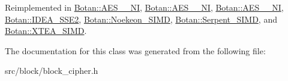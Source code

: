 Reimplemented in \hyperlink{classBotan_1_1AES__256__NI_ae1665eab51de52a0fa31d6dddad61bfb}{Botan\-::\-A\-E\-S\-\_\-\_\-\-N\-I}, \hyperlink{classBotan_1_1AES__192__NI_afa36a09a188d5c222d8eecdfc3cb406a}{Botan\-::\-A\-E\-S\-\_\-\_\-\-N\-I}, \hyperlink{classBotan_1_1AES__128__NI_adfc8b702ee1865e4363d29cea8867c48}{Botan\-::\-A\-E\-S\-\_\-\_\-\-N\-I}, \hyperlink{classBotan_1_1IDEA__SSE2_abdddb2c041e84106060c9f07f0091e80}{Botan\-::\-I\-D\-E\-A\-\_\-\-S\-S\-E2}, \hyperlink{classBotan_1_1Noekeon__SIMD_ad3c3f7932218b1b1f78b409accb6e4fe}{Botan\-::\-Noekeon\-\_\-\-S\-I\-M\-D}, \hyperlink{classBotan_1_1Serpent__SIMD_a61e8fa4a2a69719d049555a833d9ba81}{Botan\-::\-Serpent\-\_\-\-S\-I\-M\-D}, and \hyperlink{classBotan_1_1XTEA__SIMD_a844069bae910399d2d2632ae1f419a6b}{Botan\-::\-X\-T\-E\-A\-\_\-\-S\-I\-M\-D}.



The documentation for this class was generated from the following file\-:\begin{DoxyCompactItemize}
\item 
src/block/block\-\_\-cipher.\-h\end{DoxyCompactItemize}
